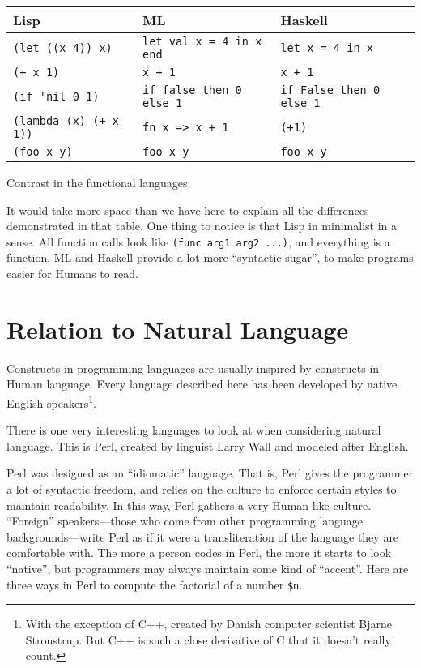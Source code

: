 \documentclass[12pt]{article}
\begin{document}
\begin{Figure}
\label{fig:functional-comparison}
\begin{tabular}{l|l|l}
\textbf{Lisp}            & \textbf{ML}                   & \textbf{Haskell} \\
\hline
\verb+(let ((x 4)) x)+   & \verb+let val x = 4 in x end+ & \verb+let x = 4 in x+ \\
\verb|(+ x 1)|           & \verb|x + 1|                  & \verb|x + 1| \\
\verb|(if 'nil 0 1)|     & \verb+if false then 0 else 1+ & \verb+if False then 0 else 1+ \\
\verb|(lambda (x) (+ x 1))| & \verb|fn x => x + 1|       & \verb|(+1)| \\
\verb|(foo x y)|         & \verb|foo x y|                & \verb|foo x y| \\
\end{tabular}
\caption{Contrast in the functional languages.}
\end{Figure}

It would take more space than we have here to explain all the
differences demonstrated in that table.  One thing to notice is that
Lisp in minimalist in a sense.  All function calls look like
\texttt{(func arg1 arg2 ...)}, and everything is a function.  ML and
Haskell provide a lot more ``syntactic sugar'', to make programs easier
for Humans to read.

\section{Relation to Natural Language}

Constructs in programming languages are usually inspired by constructs
in Human language.  Every language described here has been developed by
native English speakers\footnote{With the exception of C++, created by
Danish computer scientist Bjarne Stroustrup.  But C++ is such a close
derivative of C that it doesn't really count.}.

There is one very interesting languages to look at when considering
natural language.  This is Perl, created by linguist Larry Wall and
modeled after English.

Perl was designed as an ``idiomatic'' language.  That is, Perl gives the
programmer a lot of syntactic freedom, and relies on the culture to
enforce certain styles to maintain readability.  In this way, Perl
gathers a very Human-like culture.  ``Foreign'' speakers---those who
come from other programming language backgrounds---write Perl as if it
were a transliteration of the language they are comfortable with.  The
more a person codes in Perl, the more it starts to look ``native'', but
programmers may always maintain some kind of ``accent''.    Here are
three ways in Perl to compute the factorial of a number \texttt{\$n}.
\end{document}
